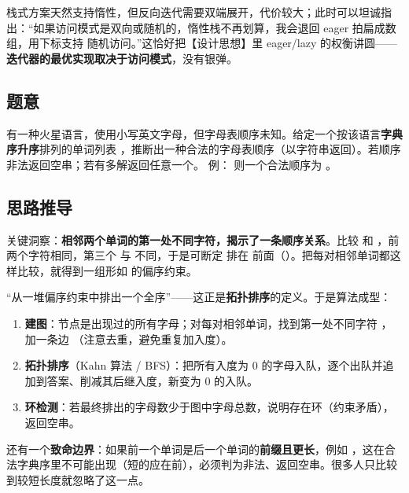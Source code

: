 \begin{followup}
栈式方案天然支持惰性，但反向迭代需要双端展开，代价较大；此时可以坦诚指出：“如果访问模式是双向或随机的，惰性栈不再划算，我会退回 eager 拍扁成数组，用下标支持  随机访问。”这恰好把【设计思想】里 eager/lazy 的权衡讲圆——\textbf{迭代器的最优实现取决于访问模式}，没有银弹。
\end{followup}


\subsection*{题意}
有一种火星语言，使用小写英文字母，但字母表顺序未知。给定一个按该语言\textbf{字典序升序}排列的单词列表 ，推断出一种合法的字母表顺序（以字符串返回）。若顺序非法返回空串；若有多解返回任意一个。
例： 则一个合法顺序为 。

\subsection*{思路推导}
关键洞察：\textbf{相邻两个单词的第一处不同字符，揭示了一条顺序关系}。比较  和 ，前两个字符相同，第三个  与  不同，于是可断定  排在  前面（）。把每对相邻单词都这样比较，就得到一组形如  的偏序约束。

“从一堆偏序约束中排出一个全序”——这正是\textbf{拓扑排序}的定义。于是算法成型：
\begin{enumerate}
  \item \textbf{建图}：节点是出现过的所有字母；对每对相邻单词，找到第一处不同字符 ，加一条边 （注意去重，避免重复加入度）。
  \item \textbf{拓扑排序}（Kahn 算法 / BFS）：把所有入度为 0 的字母入队，逐个出队并追加到答案、削减其后继入度，新变为 0 的入队。
  \item \textbf{环检测}：若最终排出的字母数少于图中字母总数，说明存在环（约束矛盾），返回空串。
\end{enumerate}

还有一个\textbf{致命边界}：如果前一个单词是后一个单词的\textbf{前缀且更长}，例如 \code{["abc","ab"]}，这在合法字典序里不可能出现（短的应在前），必须判为非法、返回空串。很多人只比较到较短长度就忽略了这一点。

